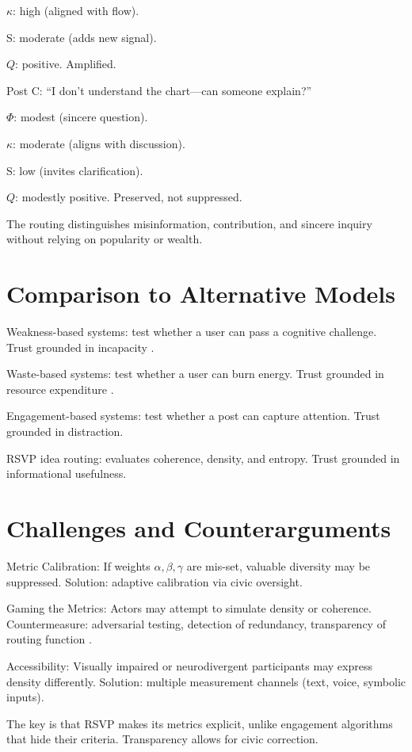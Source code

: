 \documentclass{book}
\begin{document}
\(\kappa\): high (aligned with flow).

S: moderate (adds new signal).

\( Q \): positive. Amplified.

Post C: ``I don’t understand the chart—can someone explain?''

\(\Phi\): modest (sincere question).

\(\kappa\): moderate (aligns with discussion).

S: low (invites clarification).

\( Q \): modestly positive. Preserved, not suppressed.

The routing distinguishes misinformation, contribution, and sincere inquiry without relying on popularity or wealth.

\section{Comparison to Alternative Models}

Weakness-based systems: test whether a user can pass a cognitive challenge. Trust grounded in incapacity \cite{conitzer2020}.

Waste-based systems: test whether a user can burn energy. Trust grounded in resource expenditure \cite{nakamoto2008}.

Engagement-based systems: test whether a post can capture attention. Trust grounded in distraction.

RSVP idea routing: evaluates coherence, density, and entropy. Trust grounded in informational usefulness.

\section{Challenges and Counterarguments}

Metric Calibration: If weights \( \alpha, \beta, \gamma \) are mis-set, valuable diversity may be suppressed. Solution: adaptive calibration via civic oversight.

Gaming the Metrics: Actors may attempt to simulate density or coherence. Countermeasure: adversarial testing, detection of redundancy, transparency of routing function \cite{szegedy2014}.

Accessibility: Visually impaired or neurodivergent participants may express density differently. Solution: multiple measurement channels (text, voice, symbolic inputs).

The key is that RSVP makes its metrics explicit, unlike engagement algorithms that hide their criteria. Transparency allows for civic correction.
\end{document}
